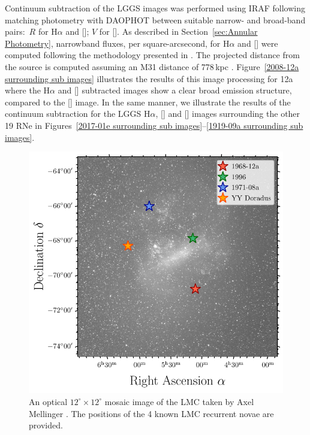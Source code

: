 \documentclass[fleqn,usenatbib]{mnras}
\begin{document}
Continuum subtraction of the LGGS images was performed using IRAF \citep{1986SPIE..627..733T,1993ASPC...52..173T} following matching photometry with DAOPHOT \citep{1987PASP...99..191S} between suitable narrow- and broad-band pairs:\ $R$ for H$\alpha$ and []; $V$ for []. As described in Section~\ref{sec:Annular Photometry}, narrowband fluxes, per square-arcsecond, for H$\alpha$ and [] were computed following the methodology presented in \citet{2010ApJS..187..275S}. The projected distance from the source is computed assuming an M31 distance of 778\,kpc \citep{1998ApJ...503L.131S}. Figure~\ref{2008-12a surrounding sub images} illustrates the results of this image processing for 12a where the H$\alpha$ and [] subtracted images show a clear broad emission structure, compared to the [] image. In the same manner, we illustrate the results of the continuum subtraction for the LGGS H$\alpha$, [] and [] images surrounding the other 19 RNe in Figures~\ref{2017-01e surrounding sub images}--\ref{1919-09a surrounding sub images}.
\begin{figure}
\includegraphics[width=\columnwidth]{Figures/Mellinger_LMC_RNe.pdf}
\caption{An optical $12^\circ\times 12^\circ$ mosaic image of the LMC taken by Axel Mellinger \citep{2009PASP..121.1180M}. The positions of the 4 known LMC recurrent novae are provided.\label{fig:LMC RNe}}
\end{figure}
\end{document}
